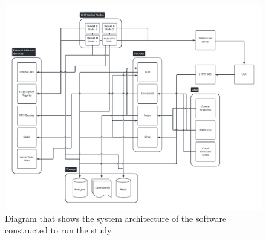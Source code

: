 
\begin{figure}[H]
    \centering
    \includegraphics[width=\textwidth]{content/figures/assets/06-system-architecture-diagram.pdf}
    \caption{Diagram that shows the system architecture of the software constructed to run the study}
    \label{fig:system_architecture_diagram}
\end{figure}
